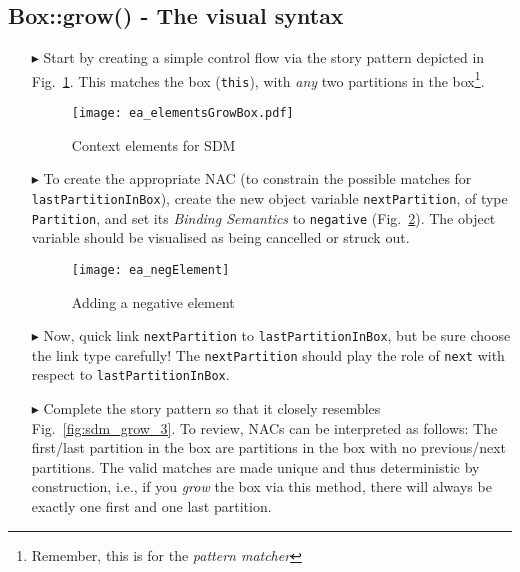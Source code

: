 \newpage
\subsection{Box::grow() - The visual syntax}
\visHeader
\hypertarget{growBox vis}{}

\begin{itemize}
 
\item[$\blacktriangleright$] Start by creating a simple control flow via the story pattern depicted in Fig.~\ref{fig:sdm_grow_1}. This matches the box
(\texttt{this}), with \emph{any} two partitions in the box\footnote{Remember, this is for the \emph{pattern matcher}}.

\begin{figure}[htbp]
\begin{center}
  \texttt{[image: ea\_elementsGrowBox.pdf]}
  \caption{Context elements for SDM}  
  \label{fig:sdm_grow_1}
\end{center}
\end{figure}

\item[$\blacktriangleright$] To create the appropriate \mbox{NAC} (to constrain the possible matches for \texttt{lastPartitionInBox}),  create the new object
variable \texttt{nextPartition}, of type \texttt{Partition}, and set  its \emph{Binding Semantics} to \texttt{negative}
(Fig.~\ref{fig:sdm_grow_2}). The object variable should be visualised as being cancelled or struck out. %
 
\begin{figure}[htbp]
\begin{center}
  \texttt{[image: ea\_negElement]}
  \caption{Adding a negative element}  
  \label{fig:sdm_grow_2}
\end{center}
\end{figure}
 
\item[$\blacktriangleright$] Now, quick link \texttt{nextPartition} to \texttt{lastPartitionInBox}, but be sure choose the link type carefully! The
\texttt{nextPartition} should play the role of \texttt{next} with respect to \texttt{lastPartitionInBox}.

\item[$\blacktriangleright$] Complete the story pattern so that it closely resembles Fig.~\ref{fig:sdm_grow_3}. To review, \mbox{NACs} can be interpreted as
follows:  The first/last partition in the box are partitions in the box with no previous/next partitions. The valid matches are made unique and thus
deterministic by construction, i.e., if you \emph{grow} the box via this method, there will always be exactly one first and one last partition.


\end{itemize}
